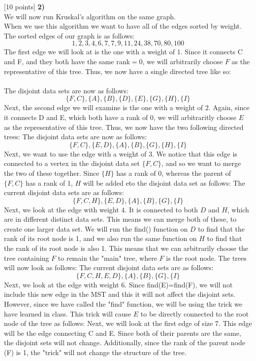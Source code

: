 \documentclass[12pt]{article}
\newcounter{ques}
\newenvironment{question}{\stepcounter{ques}{\noindent\bf Question \arabic{ques}:}}{\vspace{5mm}}
\begin{document}
\begin{question}[10 points]
\textbf{2)}\\
We will now run Kruskal's algorithm on the same graph.\\
When we use this algorithm we want to have all of the edges sorted by weight. The sorted edges of our graph is as follows:
$$1, 2, 3, 4, 6, 7, 7, 9, 11, 24, 38, 70, 80, 100$$
The first edge we will look at is the one with a weight of $1$. Since it connects C and F, and they both have the same rank$=0$, we will arbitrarily choose $F$ as the representative of this tree. Thus, we now have a single directed tree like so:\\\\
The disjoint data sets are now as follows:
$$\{F,C\},\{A\},\{B\},\{D\},\{E\},\{G\},\{H\},\{I\}$$
Next, the second edge we will examine is the one with a weight of $2$. Again, since it connects D and E, which both have a rank of 0, we will arbitraritly choose $E$ as the representative of this tree. Thus, we now have the two following directed trees:
The disjoint data sets are now as follows:
$$\{F,C\},\{E,D\},\{A\},\{B\},\{G\},\{H\},\{I\}$$
Next, we want to use the edge with a weight of $3$. We notice that this edge is connected to a vertex in the disjoint data set $\{F,C\}$, and so we want to merge the two of these together. Since $\{H\}$ has a rank of 0, whereas the parent of $\{F,C\}$ has a rank of 1, $H$ will be added eto the disjoint data set as follows:
The current disjoint data sets are as follows:
$$\{F,C,H\},\{E,D\},\{A\},\{B\},\{G\},\{I\}$$
Next, we look at the edge with weight $4$. It is connected to both $D$ and $H$, which are in different distinct data sets. This means we can merge both of these, to create one larger data set. We will run the find() function on $D$ to find that the rank of its root node is 1, and we also run the same function on $H$ to find that the rank of its root node is also 1. This means that we can arbitrarily choose the tree containing $F$ to remain the "main" tree, where $F$ is the root node. The trees will now look as follows:
The current disjoint data sets are as follows:
$$\{F,C,H,E,D\},\{A\},\{B\},\{G\},\{I\}$$
Next, we look at the edge with weight 6. Since find(E)=find(F), we will not include this new edge in the MST and this it will not affect the disjoint sets. However, since we have called the "find" function, we will be using the trick we have learned in class. This trick will cause $E$ to be directly connected to the root node of the tree as follows:
Next, we will look at the first edge of size 7. This edge will be the edge connecting C and E. Since both of their parents are the same, the disjoint sets will not change. Additionally, since the rank of the parent node (F) is 1, the "trick" will not change the structure of the tree.\\\\

\end{question}
\end{document}
